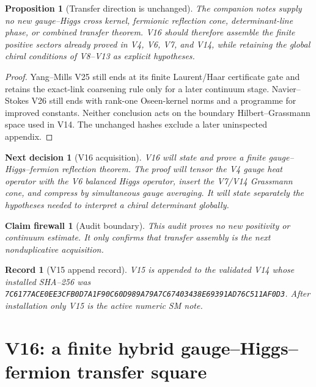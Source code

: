 \documentclass[11pt]{article}
\newtheorem{proposition}[theorem]{Proposition}
\newtheorem{firewall}[theorem]{Claim firewall}
\newtheorem{decision}[theorem]{Next decision}
\newtheorem{record}[theorem]{Record}
\theoremstyle{remark}
\begin{document}
\begin{proposition}[Transfer direction is unchanged]
\label{prop:v19v15-direction}
The companion notes supply no new gauge--Higgs cross kernel, fermionic
reflection cone, determinant-line phase, or combined transfer theorem.
V16 should therefore assemble the finite positive sectors already proved
in V4, V6, V7, and V14, while retaining the global chiral conditions of
V8--V13 as explicit hypotheses.
\end{proposition}

\begin{proof}
Yang--Mills V25 still ends at its finite Laurent/Haar certificate gate and
retains the exact-link coarsening rule only for a later continuum stage.
Navier--Stokes V26 still ends with rank-one Oseen-kernel norms and a
programme for improved constants.  Neither conclusion acts on the
boundary Hilbert--Grassmann space used in V14.  The unchanged hashes
exclude a later uninspected appendix.
\end{proof}

\begin{decision}[V16 acquisition]
\label{dec:v19v15-next}
V16 will state and prove a finite gauge--Higgs--fermion reflection theorem.
The proof will tensor the V4 gauge heat operator with the V6 balanced Higgs
operator, insert the V7/V14 Grassmann cone, and compress by simultaneous
gauge averaging.  It will state separately the hypotheses needed to
interpret a chiral determinant globally.
\end{decision}

\begin{firewall}[Audit boundary]
\label{fire:v19v15}
This audit proves no new positivity or continuum estimate.  It only
confirms that transfer assembly is the next nonduplicative acquisition.
\end{firewall}

\begin{record}[V15 append record]
\label{rec:v19v15}
V15 is appended to the validated V14 whose installed SHA--256 was
\texttt{7C6177ACE0EE3CFB0D7A1F90C60D989A79A7C67403438E69391AD76C511AF0D3}.
After installation only V15 is the active numeric SM note.
\end{record}



\section{V16: a finite hybrid gauge--Higgs--fermion transfer square}
\label{sec:v19v16}
\end{document}
